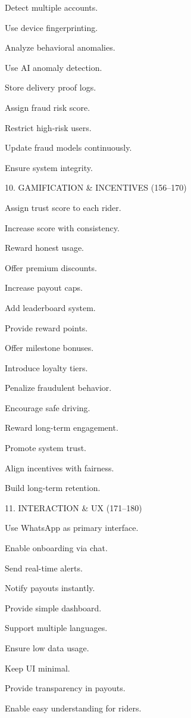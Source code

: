 Detect multiple accounts. 

Use device fingerprinting. 

Analyze behavioral anomalies. 

Use AI anomaly detection. 

Store delivery proof logs. 

Assign fraud risk score. 

Restrict high-risk users. 

Update fraud models continuously. 

Ensure system integrity. 

 

 10. GAMIFICATION & INCENTIVES (156–170) 

Assign trust score to each rider. 

Increase score with consistency. 

Reward honest usage. 

Offer premium discounts. 

Increase payout caps. 

Add leaderboard system. 

Provide reward points. 

Offer milestone bonuses. 

Introduce loyalty tiers. 

Penalize fraudulent behavior. 

Encourage safe driving. 

Reward long-term engagement. 

Promote system trust. 

Align incentives with fairness. 

Build long-term retention. 

 

11. INTERACTION & UX (171–180) 

Use WhatsApp as primary interface. 

Enable onboarding via chat. 

Send real-time alerts. 

Notify payouts instantly. 

Provide simple dashboard. 

Support multiple languages. 

Ensure low data usage. 

Keep UI minimal. 

Provide transparency in payouts. 

Enable easy understanding for riders. 

 


